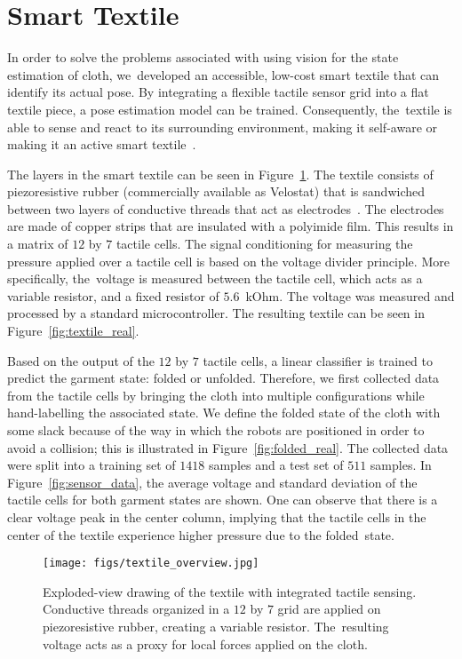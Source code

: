 \documentclass[applsci,article,accept,moreauthors,pdftex]{Definitions/mdpi}
\begin{document}
\section{Smart Textile}
\label{sec:textile}

In order to solve the problems associated with using vision for the state estimation of cloth, we~developed an accessible, low-cost smart textile that can identify its actual pose. By integrating a flexible tactile sensor grid into a flat textile piece, a pose estimation model can be trained. Consequently, the~textile is able to sense and react to its surrounding environment, making it self-aware or making it an active smart textile~\cite{Stoppa2014}.

The layers in the smart textile can be seen in Figure~\ref{fig:textile_scheme}. The textile consists of piezoresistive rubber (commercially available as Velostat\textsuperscript{\textregistered}) that is sandwiched between two layers of conductive threads that act as electrodes~\cite{Drimus2014}. The electrodes are made of copper strips that are insulated with a polyimide film. This results in a matrix of $12$ by $7$ tactile cells. The signal conditioning for measuring the pressure applied over a tactile cell is based on the voltage divider principle. More specifically, the~voltage is measured between the tactile cell, which acts as a variable resistor, and a fixed resistor of $5.6$~kOhm. The voltage was measured and processed by a standard microcontroller. The resulting textile can be seen in Figure~\ref{fig:textile_real}.

Based on the output of the $12$ by $7$ tactile cells, a linear classifier is trained to predict the garment state: folded or unfolded. Therefore, we first collected data from the tactile cells by bringing the cloth into multiple configurations while hand-labelling the associated state. We define the folded state of the cloth with some slack because of the way in which the robots are positioned in order to avoid a collision; this is illustrated in Figure~\ref{fig:folded_real}. The collected data were split into a training set of $1418$ samples and a test set of $511$ samples. In Figure~\ref{fig:sensor_data}, the average voltage and standard deviation of the tactile cells for both garment states are shown. One can observe that there is a clear voltage peak in the center column, implying that the tactile cells in the center of the textile experience higher pressure due to the folded~state.
\begin{figure}[H]
\centering
\texttt{[image: figs/textile\_overview.jpg]}
\caption{Exploded-view drawing of the textile with integrated tactile sensing. Conductive threads organized in a $12$ by $7$ grid are applied on piezoresistive rubber, creating a variable resistor. The~resulting voltage acts as a proxy for local forces applied on the cloth. } %
\label{fig:textile_scheme}
\end{figure}
\unskip
\end{document}
